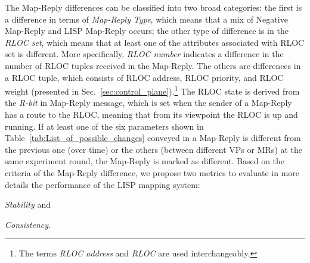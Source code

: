\begin{table}[!t]
	\centering
	\caption{Map-Reply Differences}
	\label{tab:List_of_possible_changes}{
	}
\end{table}


The Map-Reply differences can be classified into two broad categories: the first is a difference in terms of \emph{Map-Reply Type}, which means that a mix of Negative Map-Reply and LISP Map-Reply occurs; the other type of difference is in the \emph{RLOC set}, which means that at least one of the attributes associated with RLOC set is different. More specifically, \emph{RLOC number} indicates a difference in the number of RLOC tuples received in the Map-Reply. The others are differences in a RLOC tuple, which consists of RLOC address, RLOC priority, and RLOC weight (presented in Sec.~\ref{sec:control_plane}).\footnote{The terms \emph{RLOC address} and \emph{RLOC} are used interchangeably.} The RLOC state is derived from the \emph{R-bit} in Map-Reply message, which is set when the sender of a Map-Reply has a route to the RLOC, meaning that from its viewpoint the RLOC is up and running.  If at least one of the six parameters shown in Table~\ref{tab:List_of_possible_changes} conveyed in a Map-Reply is different from the previous one (over time) or the others (between different VPs or MRs) at the same experiment round, the Map-Reply is marked as different. Based on the criteria of the Map-Reply difference, we propose two metrics to evaluate in more details the performance of the LISP mapping system:
\begin{inparaenum}[(i)]
	\item \emph{Stability} and 
	\item \emph{Consistency}. 
\end{inparaenum}

